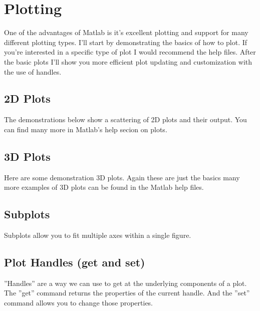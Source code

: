 
\section{Plotting}
One of the advantages of Matlab is it's excellent plotting and support for many different plotting types.
 I'll start by demonstrating the basics of how to plot.
 If you're interested in a specific type of plot I would recommend the help files.
 After the basic plots I'll show you more efficient plot updating and customization with the use of handles.

\subsection{2D Plots}
The demonstrations below show a scattering of 2D plots and their output.
 You can find many more in Matlab's help secion on plots.

\begin{quote}

\end{quote}

\pagebreak
\subsection{3D Plots}
Here are some demonstration 3D plots.
 Again these are just the basics many more examples of 3D plots can be found in the Matlab help files.

\begin{quote}
 
\end{quote}

\pagebreak
\subsection{Subplots}
Subplots allow you to fit multiple axes within a single figure.

\begin{quote}
 
\end{quote}

\pagebreak
\subsection{Plot Handles (get and set)}
''Handles'' are a way we can use to get at the underlying components of a plot.
 The ''get'' command returns the properties of the current handle.
 And the ''set'' command allows you to change those properties.

